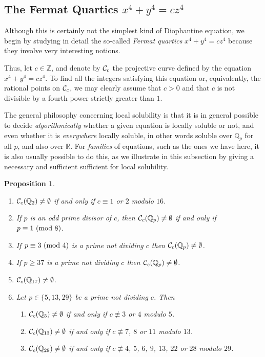 \documentclass[12pt,a4paper]{article}
\newcommand{\Q}{{\mathbb Q}}
\newcommand{\Z}{{\mathbb Z}}
\newcommand{\R}{{\mathbb R}}
\newcommand{\CC}{{\cal C}}
\newtheorem{proposition}[theorem]{Proposition}
\renewcommand{\pmod}[1]{\allowbreak\ ({\rm{mod}}\,\,#1)}
\begin{document}
\subsection{The Fermat Quartics $x^4+y^4=cz^4$}

Although this is certainly not the simplest kind of Diophantine equation,
we begin by studying in detail the so-called \emph{Fermat quartics} 
$x^4+y^4=cz^4$ because they involve very interesting notions.

Thus, let $c\in\Z$, and denote by $\CC_c$ the projective curve defined 
by the equation $x^4+y^4=cz^4$. To find all the integers satisfying this
equation or, equivalently, the rational points on $\CC_c$, we may clearly 
assume that $c>0$ and that $c$ is not divisible by a fourth 
power strictly greater than $1$.

The general philosophy concerning local solubility is that it is in general
possible to decide \emph{algorithmically} whether a given equation is locally
soluble or not, and even whether it is \emph{everywhere} locally soluble,
in other words soluble over $\Q_p$ for all $p$, and also over $\R$. For
\emph{families} of equations, such as the ones we have here, it is also
usually possible to do this, as we illustrate in this subsection by giving
a necessary and sufficient sufficient for local solubility.

\begin{proposition} 
\begin{enumerate}\item $\CC_c(\Q_2)\neq\emptyset$ if and only if $c\equiv1$ or
$2$ modulo $16$.
\item If $p$ is an odd prime divisor of $c$, then $\CC_c(\Q_p)\neq\emptyset$ if
and only if $p\equiv1\pmod8$.
\item If $p\equiv3\pmod4$ is a prime not dividing $c$ then 
$\CC_c(\Q_p)\neq\emptyset$.
\item If $p\ge37$ is a prime not dividing $c$ then $\CC_c(\Q_p)\neq\emptyset$.
\item $\CC_c(\Q_{17})\neq\emptyset$.
\item Let $p\in\{5,13,29\}$ be a prime not dividing $c$. Then
\begin{enumerate}
\item $\CC_c(\Q_5)\neq\emptyset$ if and only if $c\not\equiv3$ or $4$ modulo $5$.
\item $\CC_c(\Q_{13})\neq\emptyset$ if and only if $c\not\equiv7$, $8$ or $11$ modulo $13$.
\item $\CC_c(\Q_{29})\neq\emptyset$ if and only if $c\not\equiv4$, $5$, $6$, $9$,
$13$, $22$ or $28$ modulo $29$.
\end{enumerate}\end{enumerate}\end{proposition}
\end{document}
